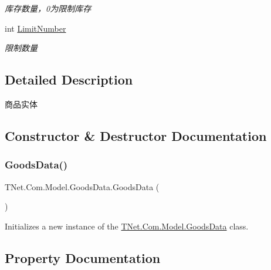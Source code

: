 \begin{DoxyCompactItemize}
\begin{DoxyCompactList}\small\item\em 库存数量，0为限制库存 \end{DoxyCompactList}\item 
int \mbox{\hyperlink{class_t_net_1_1_com_1_1_model_1_1_goods_data_a3c0423e6b0344f61e08c8c219fdb1239}{Limit\+Number}}
\begin{DoxyCompactList}\small\item\em 限制数量 \end{DoxyCompactList}\end{DoxyCompactItemize}


\subsection{Detailed Description}
商品实体 



\subsection{Constructor \& Destructor Documentation}
\mbox{\label{class_t_net_1_1_com_1_1_model_1_1_goods_data_a7971402ddd7dddac2d32d54843db3d24}} 
\subsubsection{\texorpdfstring{Goods\+Data()}{GoodsData()}}
{\footnotesize\ttfamily T\+Net.\+Com.\+Model.\+Goods\+Data.\+Goods\+Data (\begin{DoxyParamCaption}{ }\end{DoxyParamCaption})}



Initializes a new instance of the \mbox{\hyperlink{class_t_net_1_1_com_1_1_model_1_1_goods_data}{T\+Net.\+Com.\+Model.\+Goods\+Data}} class. 



\subsection{Property Documentation}
\mbox{\label{class_t_net_1_1_com_1_1_model_1_1_goods_data_aaed8f1a70d597cb090a4cfc06197e0c4}} 
